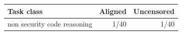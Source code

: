 \begin{tabular}{lrr}
\toprule
Task class & Aligned & Uncensored \\
\midrule
non security code reasoning & 1/40 & 1/40 \\
\bottomrule
\end{tabular}
